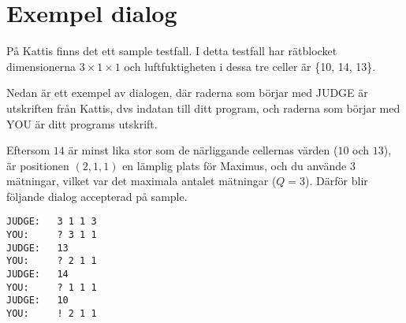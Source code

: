 \section*{Exempel dialog}
På Kattis finns det ett sample testfall. I detta testfall har rätblocket dimensionerna $3\times 1\times 1$ och luftfuktigheten i dessa tre celler är \{10, 14, 13\}.

Nedan är ett exempel av dialogen, där raderna som börjar med JUDGE är utskriften från Kattis, dvs indatan till ditt program, och raderna som börjar med YOU är ditt programs utskrift.

Eftersom $14$ är minst lika stor som de närliggande cellernas värden ($10$ och $13$), är positionen $(2, 1, 1)$ en lämplig plats för Maximus, och du använde 3 mätningar, vilket var det maximala antalet mätningar ($Q=3$). Därför blir följande dialog accepterad på sample.

\begin{verbatim}
JUDGE:   3 1 1 3
YOU:     ? 3 1 1
JUDGE:   13
YOU:     ? 2 1 1
JUDGE:   14
YOU:     ? 1 1 1
JUDGE:   10
YOU:     ! 2 1 1
\end{verbatim}
